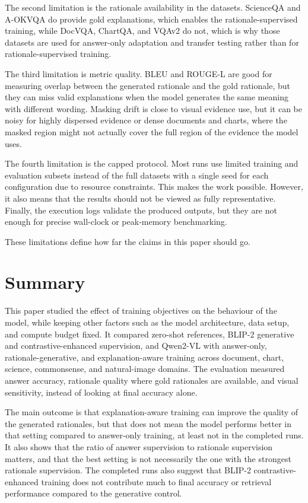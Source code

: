 The second limitation is the rationale availability in the datasets.
ScienceQA and A-OKVQA do provide gold explanations, which enables the rationale-supervised training, while DocVQA, ChartQA, and VQAv2 do not, which is why those datasets are used for answer-only adaptation and transfer testing rather than for rationale-supervised training.

The third limitation is metric quality.
BLEU and ROUGE-L are good for measuring overlap between the generated rationale and the gold rationale, but they can miss valid explanations when the model generates the same meaning with different wording.
Masking drift is close to visual evidence use, but it can be noisy for highly dispersed evidence or dense documents and charts, where the masked region might not actually cover the full region of the evidence the model uses.

The fourth limitation is the capped protocol.
Most runs use limited training and evaluation subsets instead of the full datasets with a single seed for each configuration due to resource constraints.
This makes the work possible. However, it also means that the results should not be viewed as fully representative.
Finally, the execution logs validate the produced outputs, but they are not enough for precise wall-clock or peak-memory benchmarking.

These limitations define how far the claims in this paper should go.

\section{Summary}
This paper studied the effect of training objectives on the behaviour of the model, while keeping other factors such as the model architecture, data setup, and compute budget fixed.
It compared zero-shot references, BLIP-2 generative and contrastive-enhanced supervision, and Qwen2-VL with answer-only, rationale-generative, and explanation-aware training across document, chart, science, commonsense, and natural-image domains.
The evaluation measured answer accuracy, rationale quality where gold rationales are available, and visual sensitivity, instead of looking at final accuracy alone.

The main outcome is that explanation-aware training can improve the quality of the generated rationales, but that does not mean the model performs better in that setting compared to answer-only training, at least not in the completed runs.
It also shows that the ratio of answer supervision to rationale supervision matters, and that the best setting is not necessarily the one with the strongest rationale supervision.
The completed runs also suggest that BLIP-2 contrastive-enhanced training does not contribute much to final accuracy or retrieval performance compared to the generative control.

